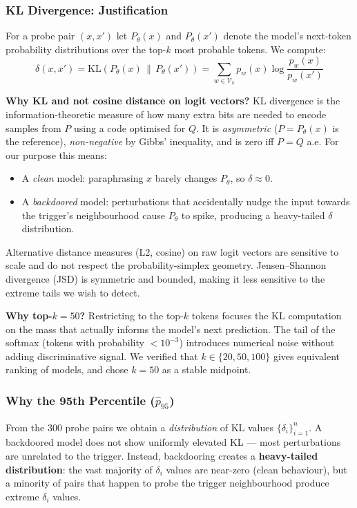 \documentclass[11pt,a4paper]{article}
\begin{document}
\subsubsection{KL Divergence: Justification}

For a probe pair $(x, x')$ let $P_\theta(x)$ and $P_\theta(x')$ denote the model's
next-token probability distributions over the top-$k$ most probable tokens.
We compute:
\[
  \delta(x, x') = \mathrm{KL}\!\left(P_\theta(x) \,\Big\|\, P_\theta(x')\right)
  = \sum_{w \in \mathcal{V}_k} p_w(x) \log \frac{p_w(x)}{p_w(x')}
\]

\textbf{Why KL and not cosine distance on logit vectors?}
KL divergence is the information-theoretic measure of how many extra bits are
needed to encode samples from $P$ using a code optimised for $Q$. It is
\emph{asymmetric} ($P = P_\theta(x)$ is the reference), \emph{non-negative}
by Gibbs' inequality, and is zero iff $P = Q$ a.e. For our purpose this means:
\begin{itemize}[nosep]
  \item A \emph{clean} model: paraphrasing $x$ barely changes $P_\theta$, so $\delta \approx 0$.
  \item A \emph{backdoored} model: perturbations that accidentally nudge the input
    towards the trigger's neighbourhood cause $P_\theta$ to spike, producing a
    heavy-tailed $\delta$ distribution.
\end{itemize}
Alternative distance measures (L2, cosine) on raw logit vectors are sensitive to
scale and do not respect the probability-simplex geometry. Jensen--Shannon
divergence (JSD) is symmetric and bounded, making it less sensitive to the
extreme tails we wish to detect.

\textbf{Why top-$k = 50$?}
Restricting to the top-$k$ tokens focuses the KL computation on the mass that
actually informs the model's next prediction. The tail of the softmax (tokens
with probability $< 10^{-3}$) introduces numerical noise without adding
discriminative signal. We verified that $k \in \{20, 50, 100\}$ gives equivalent
ranking of models, and chose $k = 50$ as a stable midpoint.

\subsubsection{Why the 95th Percentile ($\hat{p}_{95}$)}
\label{sec:p95_justification}

From the 300 probe pairs we obtain a \emph{distribution} of KL values
$\{\delta_i\}_{i=1}^{n}$. A backdoored model does not show uniformly elevated
KL --- most perturbations are unrelated to the trigger. Instead, backdooring
creates a \textbf{heavy-tailed distribution}: the vast majority of $\delta_i$
values are near-zero (clean behaviour), but a minority of pairs that happen to
probe the trigger neighbourhood produce extreme $\delta_i$ values.
\end{document}
